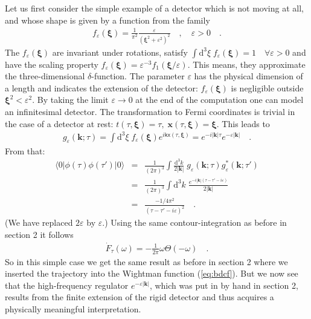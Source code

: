 \documentclass[a4paper,12pt]{article}
\newcommand{\bra}[1]{\langle #1|}
\newcommand{\ket}[1]{|#1\rangle }
\newcommand{\eps}{\varepsilon}
\newcommand{\Fd}{\dot F_{\tau}(\omega)}
\newcommand{\vx}{\mathbf{x}}
\newcommand{\vk}{\mathbf{k}}
\newcommand{\vxi}{\boldsymbol{\xi}}
\newcommand{\vvx}{\mathsf x}
\newcommand{\vvk}{\mathsf k}
\newcommand{\vac}{\ket{0}}
\newcommand{\cav}{\bra{0}}
\renewcommand{\d}{\mathrm{d}}
\begin{document}
Let us first consider the simple example of a detector which is not moving at all, and 
whose shape is given by a function from the family
\begin{eqnarray}
\label{eq:det}
f_\eps(\vxi)=\frac{1}{\pi^2}\frac{\eps}{(\vxi^2+\eps^2)^2}\quad,\quad\eps>0\quad.
\end{eqnarray}
The $f_\eps(\vxi)$ are invariant under rotations, satisfy 
$\int\d^3\xi\;f_\eps(\vxi)=1\quad\forall\eps>0$ and have the scaling property
$f_\eps(\vxi)=\eps^{-3}f_1(\vxi/\eps)$. This means, they approximate the three-dimensional
$\delta$-function. The parameter $\eps$ has the physical dimension of a length and 
indicates the extension of the detector: $f_\eps(\vxi)$ is negligible outside
$\vxi^2<\eps^2$. By taking the limit $ \eps\to 0$ at the end of the computation
one can model an infinitesimal detector. The transformation to Fermi coordinates is
trivial in the case of a detector at rest: $t(\tau,\vxi)=\tau,\;\vx(\tau,\vxi)=\vxi$.
This leads to
\begin{eqnarray*}
g_\eps(\vk;\tau)=\int\d^3\xi\;f_\eps(\vxi)e^{i\vvk\vvx(\tau,\vxi)}=
e^{-i|\vk|\tau}e^{-\eps|\vk|}\quad.
\end{eqnarray*}
From that:
\begin{eqnarray}
\label{eq:ruhe}
\cav\phi(\tau)\phi(\tau')\vac&=&\frac{1}{(2\pi)^3}\int\frac{\d^3 k}{2|\vk|}\;
g_\eps(\vk;\tau)g_\eps^*(\vk;\tau')\nonumber\\
&=&\frac{1}{(2\pi)^3}\int\d^3 k\;\frac{e^{-i|\vk|(\tau-\tau'-i\eps)}}{2|\vk|}\nonumber\\
&=&\frac{-1/4\pi^2}{(\tau-\tau'-i\eps)^2}\quad.
\end{eqnarray}
(We have replaced $2\eps$ by $\eps$.) Using the same contour-integration as before in 
section 2 it follows 
\begin{eqnarray*}
\Fd=-\frac{1}{2\pi}\omega\Theta(-\omega)\quad.
\end{eqnarray*}
So in this simple case we get the same result as before in section 2 where we
inserted the trajectory into the Wightman function (\ref{eq:bdcf}). But we now see that
the high-frequency regulator $e^{-\eps|\vk|}$, which was put in by hand in section 2,
results from the finite extension of the rigid detector and thus acquires a
physically meaningful interpretation. 

\bigskip
\end{document}
